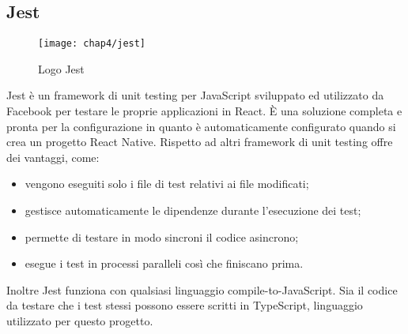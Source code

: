 \subsection{Jest}
\begin{figure}[H] 
	\centering
	\texttt{[image: chap4/jest]}
	\caption{Logo Jest}
\end{figure}
Jest è un framework di unit testing per JavaScript sviluppato ed utilizzato da Facebook per testare le proprie applicazioni in React. È una soluzione completa e pronta per la configurazione in quanto è automaticamente configurato quando si crea un progetto React Native.
Rispetto ad altri framework di unit testing offre dei vantaggi, come: 
\begin{itemize}
	\item vengono eseguiti solo i file di test relativi ai file modificati;
	\item gestisce automaticamente le dipendenze durante l'esecuzione dei test;
	\item permette di testare in modo sincroni il codice asincrono;
	\item esegue i test in processi paralleli così che finiscano prima.
\end{itemize}
Inoltre Jest funziona con qualsiasi linguaggio compile-to-JavaScript. Sia il codice da testare che i test stessi possono essere scritti in TypeScript, linguaggio utilizzato per questo progetto. 
